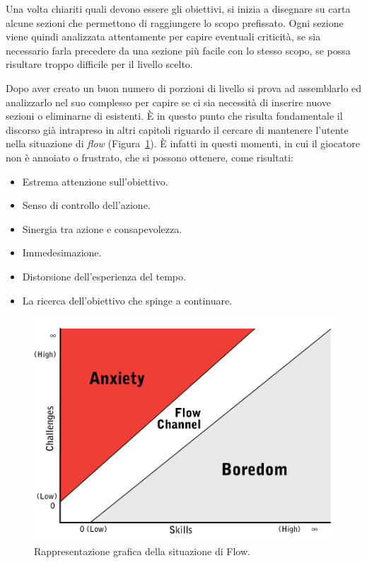 Una volta chiariti quali devono essere gli obiettivi, si inizia a disegnare su carta alcune sezioni che permettono di raggiungere lo scopo prefissato. Ogni sezione viene quindi analizzata attentamente per capire eventuali criticità, se sia necessario farla precedere da una sezione più facile con lo stesso scopo, se possa risultare troppo difficile per il livello scelto.

Dopo aver creato un buon numero di porzioni di livello si prova ad assemblarlo ed analizzarlo nel suo complesso per capire se ci sia necessità di inserire nuove sezioni o eliminarne di esistenti.
È in questo punto che risulta fondamentale il discorso già intrapreso in altri capitoli riguardo il cercare di mantenere l’utente nella situazione di \textit{flow} (Figura~\ref{fig:level_design_flow}). È infatti in questi momenti, in cui il giocatore non è annoiato o frustrato, che si possono ottenere, come risultati:

\begin{itemize}
	\item Estrema attenzione sull’obiettivo.
	\item Senso di controllo dell’azione.
	\item Sinergia tra azione e consapevolezza.
	\item Immedesimazione.
	\item Distorsione dell’esperienza del tempo.
	\item La ricerca dell’obiettivo che spinge a continuare.
\end{itemize}

\begin{figure}%
	\centering
	\includegraphics[width= 0.8\columnwidth]{images/gameDesign/36_flow.jpg}
	\caption{Rappresentazione grafica della situazione di Flow.}
	\label{fig:level_design_flow}
\end{figure}

